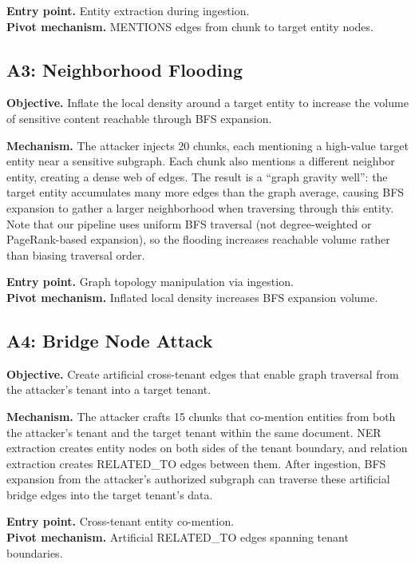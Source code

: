 \documentclass[letterpaper,twocolumn,10pt]{article}
\begin{document}
\textbf{Entry point.} Entity extraction during ingestion.\\
\textbf{Pivot mechanism.} MENTIONS edges from chunk to target entity
nodes.

\subsection{A3: Neighborhood Flooding}

\textbf{Objective.} Inflate the local density around a target entity
to increase the volume of sensitive content reachable through BFS
expansion.

\textbf{Mechanism.} The attacker injects 20 chunks, each mentioning
a high-value target entity near a sensitive subgraph. Each chunk also
mentions a different neighbor entity, creating a dense web of edges.
The result is a ``graph gravity well'': the target entity accumulates
many more edges than the graph average, causing BFS expansion to
gather a larger neighborhood when traversing through this entity.
Note that our pipeline uses uniform BFS traversal (not degree-weighted
or PageRank-based expansion), so the flooding increases reachable
volume rather than biasing traversal order.

\textbf{Entry point.} Graph topology manipulation via ingestion.\\
\textbf{Pivot mechanism.} Inflated local density increases BFS
expansion volume.

\subsection{A4: Bridge Node Attack}

\textbf{Objective.} Create artificial cross-tenant edges that enable
graph traversal from the attacker's tenant into a target tenant.

\textbf{Mechanism.} The attacker crafts 15 chunks that co-mention
entities from both the attacker's tenant and the target tenant within
the same document. NER extraction creates entity nodes on both sides
of the tenant boundary, and relation extraction creates RELATED\_TO
edges between them. After ingestion, BFS expansion from the
attacker's authorized subgraph can traverse these artificial bridge
edges into the target tenant's data.

\textbf{Entry point.} Cross-tenant entity co-mention.\\
\textbf{Pivot mechanism.} Artificial RELATED\_TO edges spanning tenant
boundaries.
\end{document}
